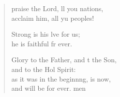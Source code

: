 \settowidth{\versewidth}{Glory to the Father, and to the Son, *}
\begin{verse}%
  \begin{patverse}
     praise the Lord, ll you nations,\Med\\
acclaim him, all yu peoples!

Strong is his lve for us;\Med\\
he is faithful fr ever.

Glory to the Father, and t the Son,\Med\\
and to the Hol Spirit:\\
as it was in the beginn\pointup{\i}ng, is now,\Med\\
and will be for ever. men
  \end{patverse}
\end{verse}

